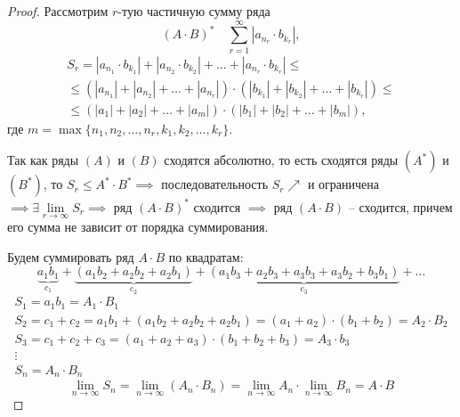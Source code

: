 \begin{proof}
    Рассмотрим $r$-тую частичную сумму ряда
    \[
        (A\cdot B)^* \quad \sum_{r=1}^{\infty}|a_{n_r}\cdot b_{k_r}|,
    \]
    \begin{multline*}
        S_r = |a_{n_1} \cdot b_{k_1}| + |a_{n_2} \cdot b_{k_2}| + \ldots + |a_{n_r} \cdot b_{k_r}| \leqslant \\
        \leqslant (|a_{n_1}| + |a_{n_2}| + \ldots + |a_{n_r}|) \cdot (|b_{k_1}| + |b_{k_2}| + \ldots + |b_{k_r}|) \leqslant \\
        \leqslant (|a_1| + |a_2| + \ldots + |a_m|) \cdot (|b_1| + |b_2| + \ldots + |b_m|),
    \end{multline*}
    где $m = \max\{n_1,n_2,\ldots,n_r,k_1,k_2,\ldots,k_r\}$.

    Так как ряды $(A)$ и $(B)$ сходятся абсолютно, то есть сходятся ряды $(A^*)$ и $(B^*)$, то $S_r \leqslant A^* \cdot B^* \implies$ последовательность $S_r \nearrow$ и ограничена $\implies \exists \underset{r\rightarrow\infty}{\lim} S_r \implies$ ряд $(A\cdot B)^*$ сходится $\implies$ ряд $ (A\cdot B) $ -- сходится, причем его сумма не зависит от порядка суммирования.

    Будем суммировать ряд $A\cdot B$ по квадратам:
    \[
        \underbrace{a_1b_1}_{c_1} + \underbrace{(a_1b_2 + a_2 b_2 + a_2 b_1)}_{c_2} + \underbrace{(a_1b_3 + a_2b_3 + a_3b_3 + a_3b_2 + b_3b_1)}_{c_3} + \ldots
    \]
    \[
        \begin{array}{l}
            S_1 = a_1b_1 = A_1\cdot B_1                                                                        \\
            S_2 = c_1 + c_2 = a_1b_1 + (a_1b_2 + a_2b_2 + a_2b_1) = (a_1 + a_2)\cdot(b_1 + b_2) = A_2\cdot B_2 \\
            S_3 = c_1 + c_2 + c_3 = (a_1 + a_2 + a_3)\cdot(b_1 + b_2 + b_3) = A_3\cdot b_3                     \\
            \vdots                                                                                             \\
            S_n = A_n \cdot B_n
        \end{array}
    \]
    \[
        \underset{n\rightarrow\infty}{\lim}S_n = \underset{n\rightarrow\infty}{\lim}(A_n \cdot B_n) = \underset{n\rightarrow\infty}{\lim}A_n \cdot \underset{n\rightarrow\infty}{\lim}B_n = A\cdot B
    \]
\end{proof}

\setcounter{subsection}{62}

